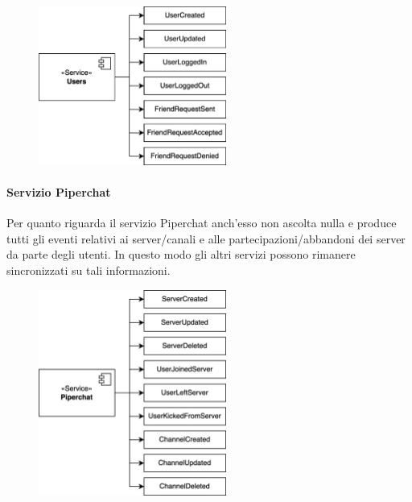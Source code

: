\begin{figure}[H]
    \centering
    \includegraphics[width=0.55\textwidth]{sections/03-design/img/events/piperchat-EventiUsers.jpg}
    \label{fig:users-events}
\end{figure}

%
%
%
\paragraph{Servizio Piperchat}

Per quanto riguarda il servizio Piperchat anch'esso non ascolta nulla e produce tutti gli eventi relativi ai server/canali e alle partecipazioni/abbandoni dei server da parte degli utenti.
%
In questo modo gli altri servizi possono rimanere sincronizzati su tali informazioni.

\begin{figure}[H]
    \centering
    \includegraphics[width=0.55\textwidth]{sections/03-design/img/events/piperchat-EventiPiperchat.jpg}
    \label{fig:piperchat-events}
\end{figure}

